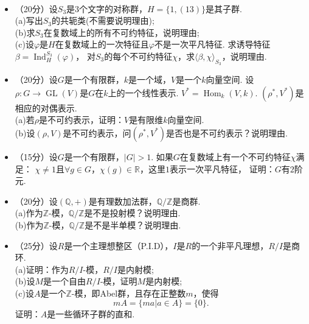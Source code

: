 ~\\
\begin{center}
\end{center}
\begin{itemize}
\item[1.]（20分）设$S_3$是$3$个文字的对称群，$H=\{1,(13)\}$是其子群.\\
(a)写出$S_3$的共轭类(不需要说明理由);\\
(b)求$S_3$在复数域上的所有不可约特征，说明理由;\\
(c)设$\varphi$是$H$在复数域上的一次特征且$\varphi$不是一次平凡特征. 
求诱导特征$\beta=\operatorname*{Ind}^{S_3}_H (\varphi)$，
对$S_3$的每个不可约特征$\chi$，求$\langle\beta,\chi\rangle_{S_3}$，说明理由.

\item[2.]（20分）设$G$是一个有限群，$k$是一个域，$V$是一个$k$向量空间. 
设$\rho:G\rightarrow \operatorname*{GL}(V)$是$G$在$k$上的一个线性表示. 
$V^{*}=\operatorname*{Hom}_k(V,k)$. $(\rho^{*},V^{*})$是相应的对偶表示.\\
(a)若$\rho$是不可约表示，证明：$V$是有限维$k$向量空间.\\
(b)设$(\rho,V)$是不可约表示，问$(\rho^{*},V^{*})$是否也是不可约表示？说明理由.

\item[3.]（15分）设$G$是一个有限群，$|G|>1$. 
如果$G$在复数域上有一个不可约特征$\chi$满足：
$\chi\neq 1$且$\forall g\in G$，$\chi(g)\in \mathbb{R}$，这里$1$表示一次平凡特征，
证明：$G$有$2$阶元.

\item[4.]（20分）设$(\mathbb{Q},+)$是有理数加法群，$\mathbb{Q}/\mathbb{Z}$是商群.\\
(a)作为$\mathbb{Z}$-模，$\mathbb{Q}/\mathbb{Z}$是不是投射模？说明理由.\\
(b)作为$\mathbb{Z}$-模，$\mathbb{Q}/\mathbb{Z}$是不是半单模？说明理由.

\item[5.]（25分）设$R$是一个主理想整区（P.I.D），$I$是$R$的一个非平凡理想，$R/I$是商环.\\
(a)证明：作为$R/I$-模，$R/I$是内射模;\\
(b)设$M$是一个自由$R/I$-模，证明$M$是内射模;\\
(c)设$A$是一个$\mathbb{Z}$-模，即Abel群，且存在正整数$m$，使得
$$mA=\{ma\vert a\in A\}=\{0\}.$$
证明：$A$是一些循环子群的直和.
\end{itemize}


